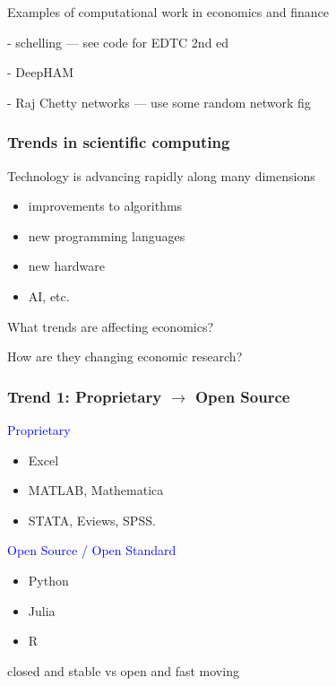 \documentclass[
    xcolor={svgnames,dvipsnames},
    hyperref={colorlinks, citecolor=DeepPink4, linkcolor=DarkRed, urlcolor=DarkBlue}
    ]{beamer}  %
\newcommand{\blue}[1]{\textcolor{Blue}{\sf #1}}
\newcommand{\1}{\mathbbm 1}
\begin{document}
\begin{frame}
    
    Examples of computational work in economics and finance

    - schelling  --- see code for EDTC 2nd ed

    - DeepHAM

    - Raj Chetty networks --- use some random network fig

\end{frame}


\begin{frame}
    \frametitle{Trends in scientific computing}

    Technology is advancing rapidly along many dimensions
    \begin{itemize}
        \item improvements to algorithms
    \vspace{0.3em}
        \item new programming languages
    \vspace{0.3em}
        \item new hardware
    \vspace{0.3em}
        \item AI, etc.
    \end{itemize}

    \vspace{0.3em}
    \vspace{0.3em}
    What trends are affecting economics?

    \vspace{0.3em}
    \vspace{0.3em}
    How are they changing economic research?

\end{frame}


\begin{frame}
    \frametitle{Trend 1: Proprietary $\to$ Open Source}
    
    \blue{Proprietary} 
    \begin{itemize}
        \item Excel
        \item MATLAB, Mathematica
        \item STATA, Eviews, SPSS.
    \end{itemize}
    

    \vspace{0.5em}
    \vspace{0.5em}
    \blue{Open Source / Open Standard} 
    
    \begin{itemize}
        \item Python
        \item Julia
        \item R
    \end{itemize}


    \begin{center}
        closed and stable vs open and fast moving
    \end{center}

\end{frame}
\end{document}
